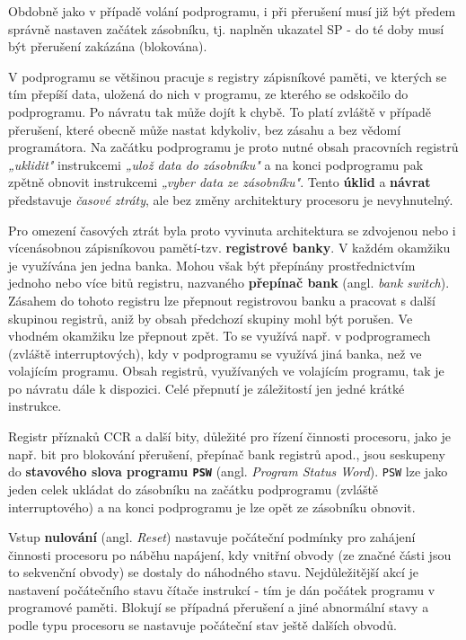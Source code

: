     Obdobně jako v případě volání podprogramu, i při přerušení musí již být předem správně nastaven 
    začátek zásobníku, tj. naplněn ukazatel SP - do té doby musí být přerušení zakázána (blokována).
    
    V podprogramu se většinou pracuje s registry zápisníkové paměti, ve kterých se tím přepíší 
    data, uložená do nich v programu, ze kterého se odskočilo do podprogramu. Po návratu tak může 
    dojít k chybě. To platí zvláště v případě přerušení, které obecně může nastat kdykoliv, bez 
    zásahu a bez vědomí programátora. Na začátku podprogramu je proto nutné obsah pracovních 
    registrů \emph{„uklidit"} instrukcemi \emph{„ulož data do zásobníku"} a na konci podprogramu 
    pak zpětně obnovit instrukcemi \emph{„vyber data ze zásobníku"}. Tento \textbf{úklid} a 
    \textbf{návrat} představuje \emph{časové ztráty}, ale bez změny architektury procesoru je 
    nevyhnutelný.
    
    Pro omezení časových ztrát byla proto vyvinuta architektura se zdvojenou nebo i vícenásobnou 
    zápisníkovou pamětí-tzv. \textbf{registrové banky}. V každém okamžiku je využívána jen jedna 
    banka. Mohou však být přepínány prostřednictvím jednoho nebo více bitů registru, nazvaného 
    \textbf{přepínač bank} (angl. \emph{bank switch}). Zásahem do tohoto registru lze přepnout 
    registrovou banku a pracovat s další skupinou registrů, aniž by obsah předchozí skupiny mohl 
    být porušen. Ve vhodném okamžiku lze přepnout zpět. To se využívá např. v podprogramech 
    (zvláště interruptových), kdy v podprogramu se využívá jiná banka, než ve volajícím programu. 
    Obsah registrů, využívaných ve volajícím programu, tak je po návratu dále k dispozici. Celé 
    přepnutí je záležitostí jen jedné krátké instrukce.
    
    Registr příznaků CCR a další bity, důležité pro řízení činnosti procesoru, jako je např. bit 
    pro blokování přerušení, přepínač bank registrů apod., jsou seskupeny do \textbf{stavového 
    slova programu \texttt{PSW}} (angl. \emph{Program Status Word}). \texttt{PSW} lze jako jeden 
    celek ukládat do zásobníku na začátku podprogramu (zvláště interruptového) a na konci 
    podprogramu je lze opět ze zásobníku obnovit.
    
    Vstup \textbf{nulování} (angl. \emph{Reset}) nastavuje počáteční podmínky pro zahájení činnosti 
    procesoru po náběhu napájení, kdy vnitřní obvody (ze značné části jsou to sekvenční obvody) se 
    dostaly do náhodného stavu. Nejdůležitější akcí je nastavení počátečního stavu čítače instrukcí 
    - tím je dán počátek programu v programové paměti. Blokují se případná přerušení a jiné 
    abnormální stavy a podle typu procesoru se nastavuje počáteční stav ještě dalších obvodů.
    
